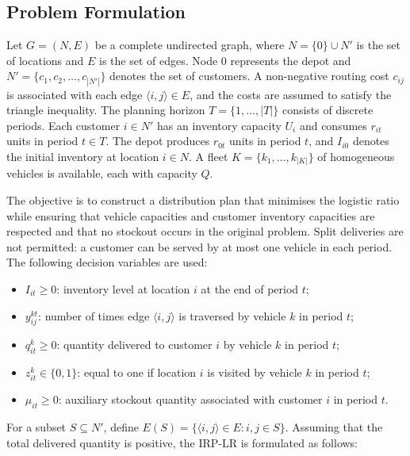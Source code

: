 \documentclass{article}
\begin{document}
\subsection{Problem Formulation}
\label{sec:problem_formulation}

Let $G=(N,E)$ be a complete undirected graph, where
$N=\{0\}\cup N'$ is the set of locations and $E$ is the set of edges.
Node $0$ represents the depot and
$N'=\{c_1,c_2,\ldots,c_{|N'|}\}$ denotes the set of customers.
A non-negative routing cost $c_{ij}$ is associated with each edge
$\langle i,j\rangle\in E$, and the costs are assumed to satisfy the triangle
inequality. The planning horizon
$T=\{1,\ldots,|T|\}$ consists of discrete periods. Each customer $i\in N'$ has an inventory capacity $U_i$ and consumes
$r_{it}$ units in period $t\in T$. The depot produces $r_{0t}$ units in
period $t$, and $I_{i0}$ denotes the initial inventory at location $i\in N$.
A fleet $K=\{k_1,\ldots,k_{|K|}\}$ of homogeneous vehicles is available,
each with capacity $Q$.

The objective is to construct a distribution plan that minimises the logistic
ratio while ensuring that vehicle capacities and customer inventory
capacities are respected and that no stockout occurs in the original problem.
Split deliveries are not permitted: a customer can be served by at most one
vehicle in each period. The following decision variables are used:

\begin{itemize}
    \item $I_{it}\geq 0$: inventory level at location $i$ at the end of
    period $t$;
    \item $y_{ij}^{kt}$: number of times edge $\langle i,j\rangle$ is
    traversed by vehicle $k$ in period $t$;
    \item $q_{it}^{k}\geq0$: quantity delivered to customer $i$ by vehicle
    $k$ in period $t$;
    \item $z_{it}^{k}\in\{0,1\}$: equal to one if location $i$ is visited
    by vehicle $k$ in period $t$;
    \item $\mu_{it}\geq0$: auxiliary stockout quantity associated with
    customer $i$ in period $t$.
\end{itemize}

For a subset $S\subseteq N'$, define
$E(S)=\{\langle i,j\rangle\in E:i,j\in S\}.
$ 
Assuming that the total delivered quantity is positive, the IRP-LR is
formulated as follows:
\end{document}
